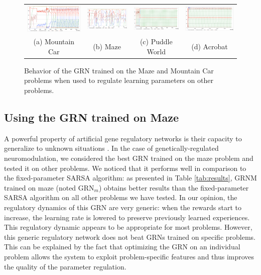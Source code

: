 \begin{figure}[b!]
\center
\setlength{\tabcolsep}{0.5mm}
\begin{tabular}{cccc}
\includegraphics[width=0.245\linewidth]{MC_GRNGenericBehavior.pdf} &
\includegraphics[width=0.245\linewidth]{MZ_GRNGenericBehavior.pdf} &
\includegraphics[width=0.245\linewidth]{PW_GRNGenericBehavior.pdf} &
\includegraphics[width=0.245\linewidth]{ACP_GRNGenericBehavior.pdf} \\
(a) Mountain Car & (b) Maze & (c) Puddle World & (d) Acrobat
\end{tabular}
\caption{Behavior of the GRN trained on the Maze and Mountain Car problems when used to regulate learning parameters on other problems.}\label{fig:GRNGenericBehavior}
\end{figure}

\subsection{Using the GRN trained on Maze}
A powerful property of artificial gene regulatory networks is their capacity to generalize to unknown situations \cite{sanchez2014gene}. In the case of genetically-regulated neuromodulation, we considered the best GRN trained on the maze problem and tested it on other problems. We noticed that it performs well in comparison to the fixed-parameter SARSA algorithm: as presented in Table \ref{tab:results}, GRNM trained on maze (noted GRN$_{m}$) obtains better results than the fixed-parameter SARSA algorithm on all other problems we have tested. In our opinion, the regulatory dynamics of this GRN are very generic: when the rewards start to increase, the learning rate is lowered to preserve previously learned experiences. This regulatory dynamic appears to be appropriate for most problems. However, this generic regulatory network does not beat GRNs trained on specific problems. This can be explained by the fact that optimizing the GRN on an individual problem allows the system to exploit problem-specific features and thus improves the quality of the parameter regulation.

